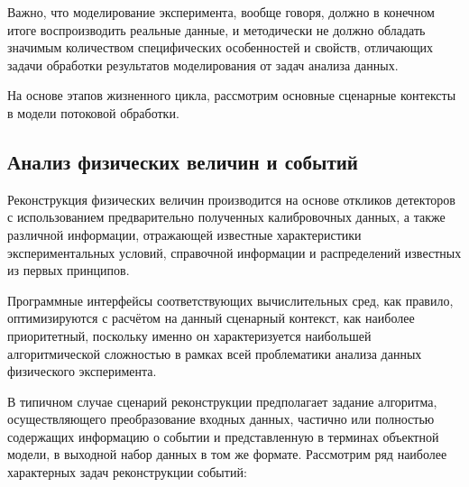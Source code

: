 Важно, что моделирование эксперимента, вообще говоря, должно в конечном
итоге воспроизводить реальные данные, и методически не должно обладать
значимым количеством специфических особенностей и свойств, отличающих
задачи обработки результатов моделирования от задач анализа данных.

На основе этапов жизненного цикла, рассмотрим основные сценарные контексты
в модели потоковой обработки.

\subsection{Анализ физических величин и событий}

Реконструкция физических величин производится на основе откликов детекторов
с использованием предварительно полученных калибровочных
данных, а также различной информации, отражающей известные
характеристики экспериментальных условий, справочной информации и
распределений известных из первых принципов.

Программные интерфейсы соответствующих вычислительных сред, как
правило, оптимизируются с расчётом на данный сценарный контекст, как
наиболее приоритетный, поскольку именно он характеризуется наибольшей
алгоритмической сложностью в рамках всей проблематики анализа данных
физического эксперимента.

В типичном случае сценарий реконструкции предполагает задание
алгоритма, осуществляющего преобразование входных данных, частично
или полностью содержащих информацию о событии и представленную в
терминах объектной модели, в выходной набор данных в том же формате.
Рассмотрим ряд наиболее характерных задач реконструкции событий:

